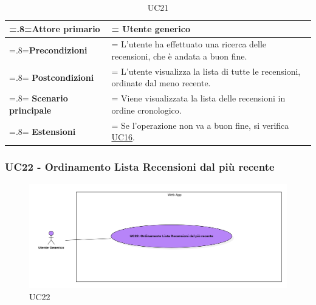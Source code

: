             \begin{table}[H]
                \centering
                \renewcommand{\arraystretch}{1.8}
                \renewcommand\tabularxcolumn[1]{m{#1}}
                \begin{tabularx}{0.9\textwidth} {
                    >{\hsize=.8\hsize\linewidth=\hsize}X
                    >{\hsize=1.2\hsize\linewidth=\hsize}X}
                    \hline
                    \textbf{Attore primario} & Utente generico \\
                    \hline
                    \textbf{Precondizioni} & L'utente ha effettuato una ricerca delle recensioni, che è andata a buon fine. \\
                    \hline
                    \textbf{Postcondizioni} & L'utente visualizza la lista di tutte le recensioni, ordinate dal meno recente. \\
                    \hline
                    \textbf{Scenario principale} & Viene visualizzata la lista delle recensioni in ordine cronologico. \\
                    \hline
                    \textbf{Estensioni} & Se l'operazione non va a buon fine, si verifica \hyperref[UC16]{UC16}. \\
                    \hline
                \end{tabularx}
                \caption{UC21}
            \end{table}

        \subsubsection{UC22 - Ordinamento Lista Recensioni dal più recente}
        \label{UC22}

            \begin{figure}[H]
                \centering
                \includegraphics[scale=0.4]{src/img/UC22.png}
                \caption{UC22}
            \end{figure}

